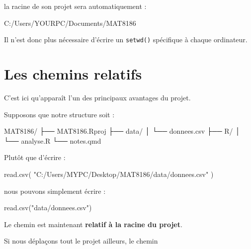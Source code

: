 \documentclass[
  letterpaper,
  DIV=11,
  numbers=noendperiod]{scrreprt}
\newenvironment{Shaded}{\begin{snugshade}}{\end{snugshade}}
\newcommand{\FunctionTok}[1]{\textcolor[rgb]{0.28,0.35,0.67}{#1}}
\newcommand{\NormalTok}[1]{\textcolor[rgb]{0.00,0.23,0.31}{#1}}
\newcommand{\StringTok}[1]{\textcolor[rgb]{0.13,0.47,0.30}{#1}}
\begin{document}
la racine de son projet sera automatiquement :

\begin{Shaded}
\begin{Highlighting}[]
\NormalTok{C:/Users/YOURPC/Documents/MAT8186}
\end{Highlighting}
\end{Shaded}

Il n'est donc plus nécessaire d'écrire un \texttt{setwd()} spécifique à
chaque ordinateur.

\section*{Les chemins relatifs}\label{les-chemins-relatifs}


C'est ici qu'apparaît l'un des principaux avantages du projet.

Supposons que notre structure soit :

\begin{Shaded}
\begin{Highlighting}[]
\NormalTok{MAT8186/}
\NormalTok{├── MAT8186.Rproj}
\NormalTok{├── data/}
\NormalTok{│   └── donnees.csv}
\NormalTok{├── R/}
\NormalTok{│   └── analyse.R}
\NormalTok{└── notes.qmd}
\end{Highlighting}
\end{Shaded}

Plutôt que d'écrire :

\begin{Shaded}
\begin{Highlighting}[]
\FunctionTok{read.csv}\NormalTok{(}
  \StringTok{"C:/Users/MYPC/Desktop/MAT8186/data/donnees.csv"}
\NormalTok{)}
\end{Highlighting}
\end{Shaded}

nous pouvons simplement écrire :

\begin{Shaded}
\begin{Highlighting}[]
\FunctionTok{read.csv}\NormalTok{(}\StringTok{"data/donnees.csv"}\NormalTok{)}
\end{Highlighting}
\end{Shaded}

Le chemin est maintenant \textbf{relatif à la racine du projet}.

Si nous déplaçons tout le projet ailleurs, le chemin
\end{document}
